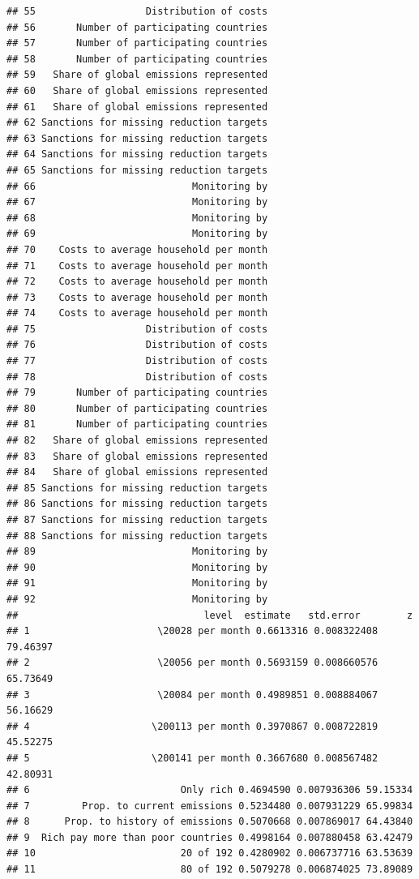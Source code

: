 \documentclass[a4paper,12pt]{article}\usepackage[]{graphicx}\usepackage[]{color}
\makeatletter
\newenvironment{kframe}{%
 \def\at@end@of@kframe{}%
 \ifinner\ifhmode%
  \def\at@end@of@kframe{\end{minipage}}%
  \begin{minipage}{\columnwidth}%
 \fi\fi%
 \def\FrameCommand##1{\hskip\@totalleftmargin \hskip-\fboxsep
 \colorbox{shadecolor}{##1}\hskip-\fboxsep
     \hskip-\linewidth \hskip-\@totalleftmargin \hskip\columnwidth}%
 \MakeFramed {\advance\hsize-\width
   \@totalleftmargin\z@ \linewidth\hsize
   \@setminipage}}%
 {\par\unskip\endMakeFramed%
 \at@end@of@kframe}
\newenvironment{knitrout}{}{} %
\makeatother
\begin{document}
\begin{knitrout}
\begin{kframe}
\begin{verbatim}
## 55                   Distribution of costs
## 56       Number of participating countries
## 57       Number of participating countries
## 58       Number of participating countries
## 59   Share of global emissions represented
## 60   Share of global emissions represented
## 61   Share of global emissions represented
## 62 Sanctions for missing reduction targets
## 63 Sanctions for missing reduction targets
## 64 Sanctions for missing reduction targets
## 65 Sanctions for missing reduction targets
## 66                           Monitoring by
## 67                           Monitoring by
## 68                           Monitoring by
## 69                           Monitoring by
## 70    Costs to average household per month
## 71    Costs to average household per month
## 72    Costs to average household per month
## 73    Costs to average household per month
## 74    Costs to average household per month
## 75                   Distribution of costs
## 76                   Distribution of costs
## 77                   Distribution of costs
## 78                   Distribution of costs
## 79       Number of participating countries
## 80       Number of participating countries
## 81       Number of participating countries
## 82   Share of global emissions represented
## 83   Share of global emissions represented
## 84   Share of global emissions represented
## 85 Sanctions for missing reduction targets
## 86 Sanctions for missing reduction targets
## 87 Sanctions for missing reduction targets
## 88 Sanctions for missing reduction targets
## 89                           Monitoring by
## 90                           Monitoring by
## 91                           Monitoring by
## 92                           Monitoring by
##                                level  estimate   std.error        z
## 1                      \20028 per month 0.6613316 0.008322408 79.46397
## 2                      \20056 per month 0.5693159 0.008660576 65.73649
## 3                      \20084 per month 0.4989851 0.008884067 56.16629
## 4                     \200113 per month 0.3970867 0.008722819 45.52275
## 5                     \200141 per month 0.3667680 0.008567482 42.80931
## 6                          Only rich 0.4694590 0.007936306 59.15334
## 7         Prop. to current emissions 0.5234480 0.007931229 65.99834
## 8      Prop. to history of emissions 0.5070668 0.007869017 64.43840
## 9  Rich pay more than poor countries 0.4998164 0.007880458 63.42479
## 10                         20 of 192 0.4280902 0.006737716 63.53639
## 11                         80 of 192 0.5079278 0.006874025 73.89089

\end{verbatim}
\end{kframe}
\end{knitrout}
\end{document}
